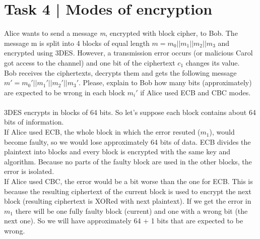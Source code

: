 \documentclass{article}
\begin{document}
\section*{Task 4 | Modes of encryption}
Alice wants to send a message \textit{m}, encrypted with block cipher, to Bob. The message m
is split into 4 blocks of equal length $m = m_0||m_1||m_2||m_3$ and encrypted using 3DES.
However, a transmission error occurs (or malicious Carol got access to the channel) and
one bit of the ciphertext $c_1$ changes its value. \\
Bob receives the ciphertexts, decrypts them and gets the following message 
$m' = m_0'||m_1'||m_2'||m_3'$. 
Please, explain to Bob how many bits (approximately) are expected to
be wrong in each block $m_i'$ if Alice used ECB and CBC modes. \\\\
3DES encrypts in blocks of 64 bits. So let's suppose each block contains about 64 bits of information. \\
If Alice used ECB, the whole block in which the error resuted ($m_1$), would
become faulty, so we would lose approximately 64 bits of data. ECB divides the plaintext
into blocks and every block is encrypted with the same key and algorithm. Because no parts
of the faulty block are used in the other blocks, the error is isolated. \\
If Alice used CBC, the error would be a bit worse than the one for ECB. This is because the
resulting ciphertext of the current block is used to encrypt the next block
(resulting ciphertext is XORed with next plaintext). If we get the error in $m_1$ there 
will be one fully faulty block (current) and one with a wrong bit (the next one).
So we will have approximately 64 + 1 bits that are expected to be wrong.
\end{document}

